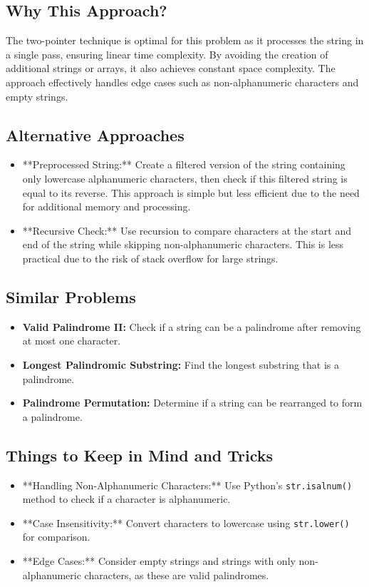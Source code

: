 \subsection*{Why This Approach?}
The two-pointer technique is optimal for this problem as it processes the string in a single pass, ensuring linear time complexity. By avoiding the creation of additional strings or arrays, it also achieves constant space complexity. The approach effectively handles edge cases such as non-alphanumeric characters and empty strings.

\subsection*{Alternative Approaches}
\begin{itemize}
    \item **Preprocessed String:**  
    Create a filtered version of the string containing only lowercase alphanumeric characters, then check if this filtered string is equal to its reverse. This approach is simple but less efficient due to the need for additional memory and processing.
    \item **Recursive Check:**  
    Use recursion to compare characters at the start and end of the string while skipping non-alphanumeric characters. This is less practical due to the risk of stack overflow for large strings.
\end{itemize}

\subsection*{Similar Problems}
\begin{itemize}
    \item \textbf{Valid Palindrome II:} Check if a string can be a palindrome after removing at most one character.
    \item \textbf{Longest Palindromic Substring:} Find the longest substring that is a palindrome.
    \item \textbf{Palindrome Permutation:} Determine if a string can be rearranged to form a palindrome.
\end{itemize}

\subsection*{Things to Keep in Mind and Tricks}
\begin{itemize}
    \item **Handling Non-Alphanumeric Characters:** Use Python’s \texttt{str.isalnum()} method to check if a character is alphanumeric.
    \item **Case Insensitivity:** Convert characters to lowercase using \texttt{str.lower()} for comparison.
    \item **Edge Cases:** Consider empty strings and strings with only non-alphanumeric characters, as these are valid palindromes.
\end{itemize}

